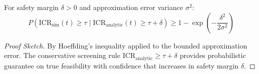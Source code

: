 \begin{theorem}
For safety margin $\delta > 0$ and approximation error variance $\sigma^2$:
$$P(\text{ICR}_{\text{sim}}(t) \geq \tau \mid \text{ICR}_{\text{analytic}}(t) \geq \tau + \delta) \geq 1 - \exp\left(-\frac{\delta^2}{2\sigma^2}\right)$$
\end{theorem}

\begin{proof}[Proof Sketch]
By Hoeffding's inequality applied to the bounded approximation error. 
The conservative screening rule $\text{ICR}_{\text{analytic}} \geq \tau + \delta$ provides 
probabilistic guarantee on true feasibility with confidence that increases in safety margin $\delta$.
\end{proof}
